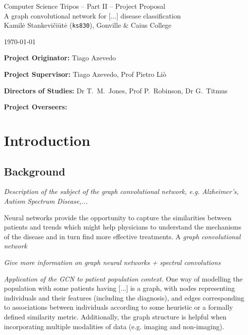 \documentclass[12pt,a4paper,twoside]{article}
\begin{document}
\begin{center}
\Large
Computer Science Tripos -- Part II -- Project Proposal\\[4mm]
\LARGE
A graph convolutional network for [...] disease classification\\[4mm]

\large
Kamilė Stankevičiūtė (\texttt{ks830}), Gonville \& Caius College

\today %
\end{center}

\vspace{5mm}
\textbf{Project Originator:} Tiago Azevedo

\textbf{Project Supervisor:} Tiago Azevedo, Prof Pietro Liò

\textbf{Directors of Studies:} Dr T.~M.~Jones, Prof P.~Robinson, Dr G.~Titmus

\textbf{Project Overseers:} 


\section*{Introduction}

\subsection*{Background}

\textit{Description of the subject of the graph convolutional network, e.g. Alzheimer's, Autism Spectrum Disease,...}

Neural networks provide the opportunity to capture the similarities between patients and trends which might help physicians to understand the mechanisms of the disease and in turn find more effective treatments. A \textit{graph convolutional network} 

\textit{Give more information on graph neural networks + spectral convolutions}

\textit{Application of the GCN to patient population context.} One way of modelling the population with some patients having [...] is a graph, with nodes representing individuals and their features (including the diagnosis), and edges corresponding to associations between individuals according to some heuristic or a formally defined similarity metric. Additionally, the graph structure is helpful when incorporating multiple modalities of data (e.g. imaging and non-imaging).
\end{document}
